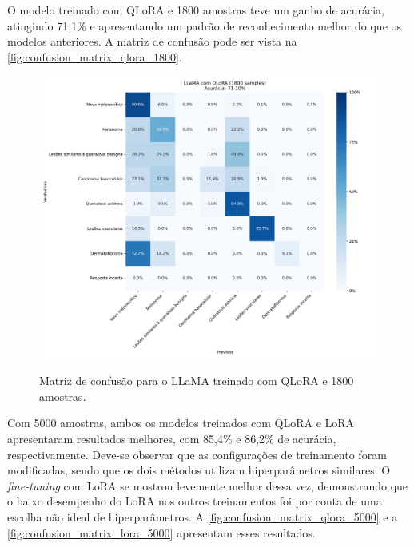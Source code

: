 O modelo treinado com \ac{QLoRA} e 1800 amostras teve um ganho de acurácia, atingindo 71,1\% e apresentando um padrão
de reconhecimento melhor do que os modelos anteriores. A matriz de confusão pode ser vista na
\autoref{fig:confusion_matrix_qlora_1800}.

\clearpage

\begin{figure}[ht]
    \centering
    \caption{\small Matriz de confusão para o \ac{LLaMA} treinado com \ac{QLoRA} e 1800 amostras.}
    \includegraphics[width=1\columnwidth,keepaspectratio]{images/confusion_matrix_qlora_1800.png}
    \label{fig:confusion_matrix_qlora_1800}
\end{figure}

Com 5000 amostras, ambos os modelos treinados com \ac{QLoRA} e \ac{LoRA} apresentaram resultados melhores, com 85,4\% e
86,2\% de acurácia, respectivamente. Deve-se observar que as configurações de treinamento foram modificadas, sendo que
os dois métodos utilizam hiperparâmetros similares. O \textit{fine-tuning} com \ac{LoRA} se mostrou levemente melhor
dessa vez, demonstrando que o baixo desempenho do \ac{LoRA} nos outros treinamentos foi por conta de uma escolha não
ideal de hiperparâmetros. A \autoref{fig:confusion_matrix_qlora_5000} e a \autoref{fig:confusion_matrix_lora_5000}
apresentam esses resultados.

\clearpage

